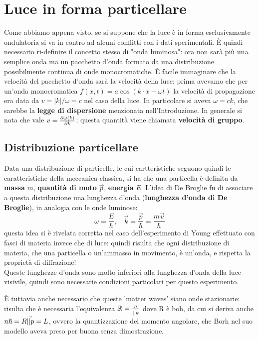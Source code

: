 \section{Luce in forma particellare}
Come abbiamo appena visto, se si suppone che la luce è in forma esclusivamente ondulatoria si va in contro ad alcuni conflitti con i dati sperimentali. È quindi necessario ri-definire il concetto stesso di "onda luminosa": ora non sarà più una semplice onda ma un pacchetto d'onda formato da una distribuzione possibilmente continua di onde monocromatiche. È facile immaginare che la velocità del pacchetto d'onda sarà la velocità della luce: prima avevamo che per un'onda monocromatica $f(x,t) = a \cos (k \cdot x - \omega t)$ la velocità di propagazione era data da $v = |k|/\omega = c$ nel caso della luce. In particolare si aveva $\omega = ck$, che sarebbe la \textbf{legge di dispersione} menzionata nell'Introduzione. In generale si nota che vale $v = \deriv[k]{\omega(k)}$; questa quantità viene chiamata \textbf{velocità di gruppo}.

\subsection{Distribuzione particellare}
Data una distribuzione di particelle, le cui cartteristiche seguono quindi le caratteristiche della meccanica classica, si ha che una particella è definita da \textbf{massa} $m$, \textbf{quantità di moto} $\vec p$, \textbf{energia} $E$.
L'idea di De Broglie fu di associare a questa distribuzione una lunghezza d'onda (\textbf{lunghezza d'onda di De Broglie}), in analogia con le onde luminose:
\[
	\omega = \frac{E}{\hslash}, \ \ \ \ 
	\vec k = \frac{\vec p}{\hslash} = \frac{m\vec v}{\hslash}
\]
questa idea si è rivelata corretta nel caso dell'esperimento di Young effettuato con fasci di materia invece che di luce: quindi risulta che ogni distribuzione di materia, che una particella o un'ammasso in movimento, è un'onda, e rispetta la proprietà di diffrazione!\\
Queste lunghezze d'onda sono molto inferiori alla lunghezza d'onda della luce visivile, quindi sono necessarie condizioni particolari per questo esperimento.

È tuttavia anche necessario che queste 'matter waves' siano onde stazionarie: risulta che è necessaria l'equivalenza $\R = \frac{n}{\abs \vec k}$ dove R è boh, da cui si deriva anche $n\h = R \abs \vec p = L$, ovvero la quantizzazione del momento angolare, che Borh nel suo modello aveva preso per buona senza dimostrazione.

